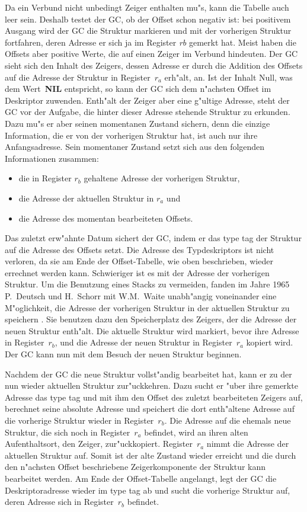 Da ein Verbund nicht unbedingt Zeiger enthalten mu"s, kann die Tabelle auch
leer sein.
Deshalb testet der GC, ob der Offset schon negativ ist: bei positivem Ausgang
wird der GC die Struktur markieren und mit der vorherigen Struktur fortfahren,
deren Adresse er sich ja im Register {\it rb\/} gemerkt hat.
Meist haben die Offsets aber positive Werte, die auf einen Zeiger im Verbund
hindeuten.
Der GC sieht sich den Inhalt des Zeigers, dessen Adresse er durch die Addition des
Offsets auf die Adresse der Struktur in Register~$r_a$ erh"alt, an.
Ist der Inhalt Null, was dem Wert~{\bf NIL} entspricht, so kann der GC sich
dem n"achsten Offset im Deskriptor zuwenden.
Enth"alt der Zeiger aber eine g"ultige Adresse, steht der GC vor der Aufgabe,
die hinter dieser Adresse stehende Struktur zu erkunden.
Dazu mu"s er aber seinen momentanen Zustand sichern, denn die einzige
Information, die er von der vorherigen Struktur hat, ist auch nur ihre
Anfangsadresse.
Sein momentaner Zustand setzt sich aus den folgenden Informationen zusammen:
\begin{itemize}
\item die in Register $r_b$ gehaltene Adresse der vorherigen Struktur,
\item die Adresse der aktuellen Struktur in $r_a$ und
\item die Adresse des momentan bearbeiteten Offsets.
\end{itemize}

Das zuletzt erw"ahnte Datum sichert der GC, indem er das type tag der
Struktur auf die Adresse des Offsets setzt.
Die Adresse des Typdeskriptors ist nicht verloren, da sie am Ende der
Offset-Tabelle, wie oben beschrieben, wieder errechnet werden kann.
Schwieriger ist es mit der Adresse der vorherigen Struktur.
Um die Benutzung eines Stacks zu vermeiden, fanden im Jahre 1965
P.~Deutsch und H.~Schorr mit W.M.~Waite unabh"angig voneinander eine
M"oglichkeit, die Adresse der vorherigen Struktur in der aktuellen
Struktur zu speichern \cite{garbColl}.
Sie benutzen dazu den Speicherplatz des Zeigers, der die Adresse der neuen
Struktur enth"alt.
Die aktuelle Struktur wird markiert, bevor ihre Adresse in Register~$r_b$,
und die Adresse der neuen Struktur in Register~$r_a$ kopiert wird.
Der GC kann nun mit dem Besuch der neuen Struktur beginnen.

\medskip
Nachdem der GC die neue Struktur vollst"andig bearbeitet hat, kann er zu
der nun wieder aktuellen Struktur zur"uckkehren.
Dazu sucht er "uber ihre gemerkte Adresse das type tag und mit ihm den Offset
des zuletzt bearbeiteten Zeigers auf, berechnet seine absolute Adresse und
speichert die dort enth"altene Adresse auf die vorherige Struktur wieder in
Register~$r_b$.
Die Adresse auf die ehemals neue Struktur, die sich noch in Register~$r_a$
befindet, wird an ihren alten Aufenthaltsort, den Zeiger, zur"uckkopiert.
Register~$r_a$ nimmt die Adresse der aktuellen Struktur auf.
Somit ist der alte Zustand wieder erreicht und die durch den n"achsten Offset
beschriebene Zeigerkomponente der Struktur kann bearbeitet werden.
Am Ende der Offset-Tabelle angelangt, legt der GC die Deskriptoradresse
wieder im type tag ab und sucht die vorherige Struktur auf, deren Adresse
sich in Register~$r_b$ befindet.


